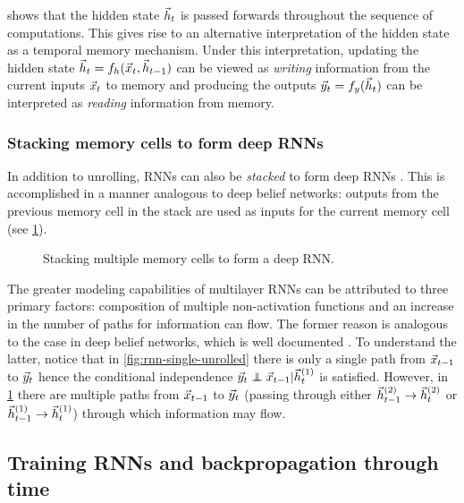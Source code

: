  shows that the hidden state $\vec{h}_t$ is passed
forwards throughout the sequence of computations. This gives rise to an
alternative interpretation of the hidden state as a temporal memory mechanism.
Under this interpretation, updating the hidden state $\vec{h}_t = f_h (\vec{x}_t,
\vec{h}_{t-1})$ can be viewed as \emph{writing} information from the current inputs
$\vec{x}_t$ to memory and producing the outputs $\vec{y}_t = f_y (\vec{h}_t)$ can be
interpreted as \emph{reading} information from memory.

\subsubsection{Stacking memory cells to form deep RNNs}

In addition to unrolling, RNNs can also be \emph{stacked} to form deep RNNs
\citep{el1995hierarchical,schmidhuber1992learning}. This is accomplished in a
manner analogous to deep belief networks: outputs from the previous memory cell
in the stack are used as inputs for the current memory cell (see
\cref{fig:rnn-multi-unrolled}).

\begin{figure}[tb]
    \centering
    \resizebox{4.5in}{!}{}
    \caption{Stacking multiple memory cells to form a deep RNN.}
    \label{fig:rnn-multi-unrolled}
\end{figure}

The greater modeling capabilities of multilayer RNNs can be attributed to three
primary factors: composition of multiple non-activation functions and an
increase in the number of paths for information can flow.
The former reason is analogous to the case in deep belief networks, which
is well documented \citep{bengio2009learning}. To understand the latter, notice
that in \cref{fig:rnn-single-unrolled} there is only a single path from
$\vec{x}_{t-1}$ to $\vec{y}_{t}$ hence the conditional independence $\y_{t} \independent
\x_{t-1} | \h^{(1)}_t$ is satisfied. However, in \cref{fig:rnn-multi-unrolled}
there are multiple paths from $\vec{x}_{t-1}$ to $\vec{y}_{t}$ (\eg passing through
either $\vec{h}^{(2)}_{t-1} \to \vec{h}^{(2)}_t$ or $\vec{h}^{(1)}_{t-1} \to \vec{h}^{(1)}_t$)
through which information may flow.


\subsection{Training RNNs and backpropagation through time}

